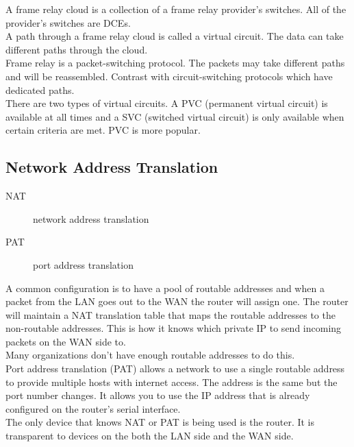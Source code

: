 A frame relay cloud is a collection of a frame relay provider's switches.
All of the provider's switches are DCEs.\\

A path through a frame relay cloud is called a virtual circuit. The data
can take different paths through the cloud.\\

Frame relay is a packet-switching protocol. The packets may take different
paths and will be reassembled. Contrast with circuit-switching protocols
which have dedicated paths.\\

There are two types of virtual circuits. A PVC (permanent virtual circuit)
is available at all times and a SVC (switched virtual circuit) is only
available when certain criteria are met. PVC is more popular.

\subsection{Network Address Translation}

\begin{description}

\item[NAT]
network address translation  

\item[PAT]
port address translation

\end{description}

A common configuration is to have a pool of routable addresses and when a
packet from the LAN goes out to the WAN the router will assign one. The
router will maintain a NAT translation table that maps the routable addresses
to the non-routable addresses. This is how it knows which private IP to
send incoming packets on the WAN side to.\\

Many organizations don't have enough routable addresses to do this.\\

Port address translation (PAT) allows a network to use a single routable
address to provide multiple hosts with internet access. The address is the
same but the port number changes. It allows you to use the IP address that is
already configured on the router's serial interface.\\

The only device that knows NAT or PAT is being used is the router. It
is transparent to devices on the both the LAN side and the WAN side.\\

